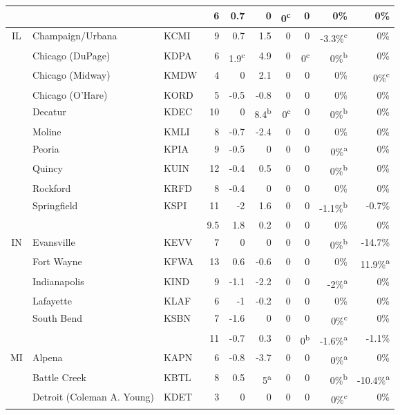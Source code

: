 \documentclass[twocol]{ametsoc}
\begin{document}
\begin{landscape}
\begin{table}[]
\begin{tabular}{@{}cllrrrrrrr@{}}
 &  &  & 6 & 0.7 & 0 & 0\textsuperscript{c} & 0 & 0\% & 0\% \\ \midrule
\multirow{11}{*}{IL} & Champaign/Urbana & KCMI & 9 & 0.7 & 1.5 & 0 & 0 & -3.3\%\textsuperscript{c} & 0\% \\
 & Chicago (DuPage) & KDPA & 6 & 1.9\textsuperscript{c} & 4.9 & 0 & 0\textsuperscript{c} & 0\%\textsuperscript{b} & 0\% \\
 & Chicago (Midway) & KMDW & 4 & 0 & 2.1 & 0 & 0 & 0\% & 0\%\textsuperscript{c} \\
 & Chicago (O'Hare) & KORD & 5 & -0.5 & -0.8 & 0 & 0 & 0\% & 0\% \\
 & Decatur & KDEC & 10 & 0 & 8.4\textsuperscript{b} & 0\textsuperscript{c} & 0 & 0\%\textsuperscript{b} & 0\% \\
 & Moline & KMLI & 8 & -0.7 & -2.4 & 0 & 0 & 0\% & 0\% \\
 & Peoria & KPIA & 9 & -0.5 & 0 & 0 & 0 & 0\%\textsuperscript{a} & 0\% \\
 & Quincy & KUIN & 12 & -0.4 & 0.5 & 0 & 0 & 0\%\textsuperscript{b} & 0\% \\
 & Rockford & KRFD & 8 & -0.4 & 0 & 0 & 0 & 0\% & 0\% \\
 & Springfield & KSPI & 11 & -2 & 1.6 & 0 & 0 & -1.1\%\textsuperscript{b} & -0.7\% \\ \cmidrule(l){2-10} 
 &  &  & 9.5 & 1.8 & 0.2 & 0 & 0 & 0\% & 0\% \\ \midrule
\multirow{6}{*}{IN} & Evansville & KEVV & 7 & 0 & 0 & 0 & 0 & 0\%\textsuperscript{b} & -14.7\% \\
 & Fort Wayne & KFWA & 13 & 0.6 & -0.6 & 0 & 0 & 0\% & 11.9\%\textsuperscript{a} \\
 & Indianapolis & KIND & 9 & -1.1 & -2.2 & 0 & 0 & -2\%\textsuperscript{a} & 0\% \\
 & Lafayette & KLAF & 6 & -1 & -0.2 & 0 & 0 & 0\% & 0\% \\
 & South Bend & KSBN & 7 & -1.6 & 0 & 0 & 0 & 0\%\textsuperscript{c} & 0\% \\ \cmidrule(l){2-10} 
 &  &  & 11 & -0.7 & 0.3 & 0 & 0\textsuperscript{b} & -1.6\%\textsuperscript{a} & -1.1\% \\ \midrule
\multirow{18}{*}{MI} & Alpena & KAPN & 6 & -0.8 & -3.7 & 0 & 0 & 0\%\textsuperscript{a} & 0\% \\
 & Battle Creek & KBTL & 8 & 0.5 & 5\textsuperscript{a} & 0 & 0 & 0\%\textsuperscript{b} & -10.4\%\textsuperscript{a} \\
 & Detroit (Coleman A. Young) & KDET & 3 & 0 & 0 & 0 & 0 & 0\%\textsuperscript{c} & 0\% \\

\end{tabular}
\end{table}
\end{landscape}
\end{document}
